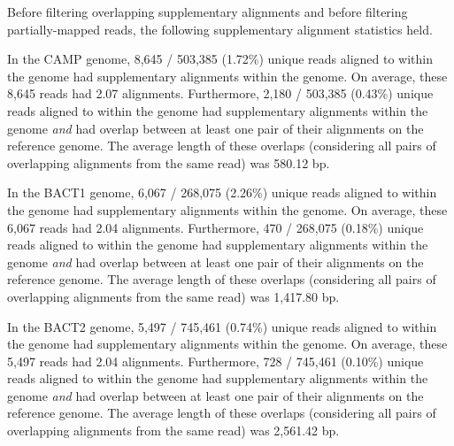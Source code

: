 Before filtering overlapping supplementary alignments and before filtering
partially-mapped reads, the following supplementary alignment statistics held.

In the CAMP genome, 8,645 / 503,385 (1.72\%) unique reads aligned to within the genome had supplementary alignments within the genome.
On average, these 8,645 reads had 2.07 alignments.
Furthermore, 2,180 / 503,385 (0.43\%) unique reads aligned to within the genome had supplementary alignments within the genome \emph{and} had overlap between at least one pair of their alignments on the reference genome.
The average length of these overlaps (considering all pairs of overlapping alignments from the same read) was 580.12 bp.

In the BACT1 genome, 6,067 / 268,075 (2.26\%) unique reads aligned to within the genome had supplementary alignments within the genome.
On average, these 6,067 reads had 2.04 alignments.
Furthermore, 470 / 268,075 (0.18\%) unique reads aligned to within the genome had supplementary alignments within the genome \emph{and} had overlap between at least one pair of their alignments on the reference genome.
The average length of these overlaps (considering all pairs of overlapping alignments from the same read) was 1,417.80 bp.

In the BACT2 genome, 5,497 / 745,461 (0.74\%) unique reads aligned to within the genome had supplementary alignments within the genome.
On average, these 5,497 reads had 2.04 alignments.
Furthermore, 728 / 745,461 (0.10\%) unique reads aligned to within the genome had supplementary alignments within the genome \emph{and} had overlap between at least one pair of their alignments on the reference genome.
The average length of these overlaps (considering all pairs of overlapping alignments from the same read) was 2,561.42 bp.
\endinput